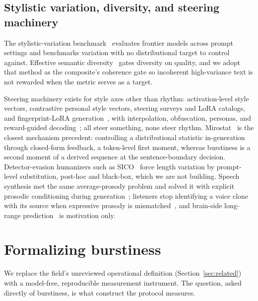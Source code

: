 \documentclass{article}
\begin{document}
\subsection{Stylistic variation, diversity, and steering machinery}
The stylistic-variation benchmark~\citep{arxiv2025benchmark} evaluates frontier models across prompt settings and benchmarks variation with no distributional target to control against. Effective semantic diversity~\citep{arxiv2025evaluating} gates diversity on quality, and we adopt that method as the composite's coherence gate so incoherent high-variance text is not rewarded when the metric serves as a target.

Steering machinery exists for style axes other than rhythm: activation-level style vectors, contrastive personal style vectors, steering surveys and LoRA catalogs, and fingerprint-LoRA generation~\citep{konen2024style, liu2025personalized, turner2026weights, arxiv2025low, arxiv2026plug}, with interpolation, obfuscation, personas, and reward-guided decoding~\citep{arxiv2024continuous, fisher2024styleremix, arxiv2026styles, arxiv2026card, arxiv2025llmbraces}; all steer something, none steer rhythm. Mirostat~\citep{basu2021mirostat} is the closest mechanism precedent: controlling a distributional statistic in-generation through closed-form feedback, a token-level first moment, whereas burstiness is a second moment of a derived sequence at the sentence-boundary decision. Detector-evasion humanizers such as SICO~\citep{lu2024large} force length variation by prompt-level substitution, post-hoc and black-box, which we are not building. Speech synthesis met the same average-prosody problem and solved it with explicit prosodic conditioning during generation~\citep{raitio2020controllable, raitio2022emphasis}; listeners stop identifying a voice clone with its source when expressive prosody is mismatched~\citep{bakkouche2025prosodic}, and brain-side long-range prediction~\citep{caucheteux2023long} is motivation only.

\section{Formalizing burstiness}\label{sec:formalizing}

We replace the field's unreviewed operational definition (Section~\ref{sec:related}) with a
model-free, reproducible measurement instrument. The question, asked directly of burstiness,
is what construct the protocol measures.
\end{document}

